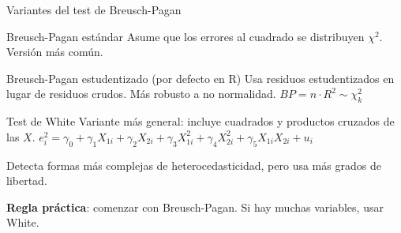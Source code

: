 \documentclass[aspectratio=169, 11pt]{beamer}
\begin{document}
\begin{frame}{Variantes del test de Breusch-Pagan}
\begin{block}{Breusch-Pagan estándar}
Asume que los errores al cuadrado se distribuyen $\chi^2$. Versión más común.
\end{block}

\begin{block}{Breusch-Pagan estudentizado (por defecto en R)}
Usa residuos estudentizados en lugar de residuos crudos. Más robusto a no normalidad.
$BP = n \cdot R^2 \sim \chi^2_{k}$
\end{block}

\begin{block}{Test de White}
Variante más general: incluye cuadrados y productos cruzados de las $X$.
{\small $e_i^2 = \gamma_0 + \gamma_1 X_{1i} + \gamma_2 X_{2i} + \gamma_3 X_{1i}^2 + \gamma_4 X_{2i}^2 + \gamma_5 X_{1i}X_{2i} + u_i$}

Detecta formas más complejas de heterocedasticidad, pero usa más grados de libertad.
\end{block}

\vspace{0.1cm}
\small
\textbf{Regla práctica}: comenzar con Breusch-Pagan. Si hay muchas variables, usar White.
\end{frame}
\end{document}
